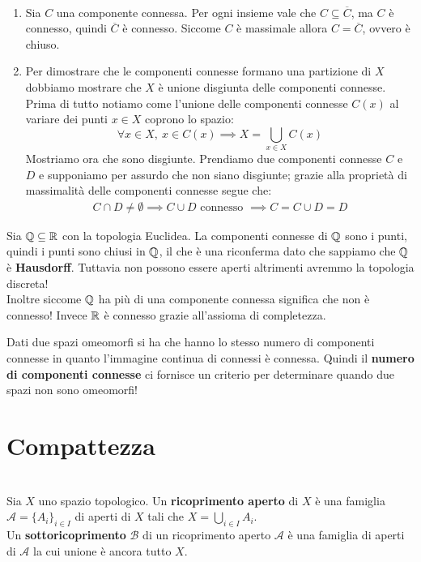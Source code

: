 \begin{demonstration}
	~{}
	\begin{enumerate}[label=\Roman*]
		\item Sia $C$ una componente connessa. Per ogni insieme vale che $C\subseteq\overline{C}$, ma $C$ è connesso, quindi $\overline{C}$ è connesso. Siccome $C$ è massimale allora $C=\overline{C}$, ovvero è chiuso.
		\item Per dimostrare che le componenti connesse formano una partizione di $X$ dobbiamo mostrare che $X$ è unione disgiunta delle componenti connesse. Prima di tutto notiamo come l'unione delle componenti connesse $C\left(x\right)$ al variare dei punti $x\in X$ coprono lo spazio:
			\begin{equation*}
				\forall x\in X,\ x\in C(x) \implies X=\bigcup_{x\in X}C(x)
			\end{equation*}
		Mostriamo ora che sono disgiunte. Prendiamo due componenti connesse $C$ e $D$ e supponiamo per assurdo che non siano disgiunte; grazie alla proprietà di massimalità delle componenti connesse segue che:
		\begin{gather*}
			C\cap D\neq\emptyset \implies C\cup D \text{ connesso } \implies C=C\cup D=D
		\end{gather*}
	\end{enumerate}
\vspace{-6mm}
\end{demonstration}
\begin{example}
	Sia $\mathbb{Q}\subseteq\mathbb{R}$ con la topologia Euclidea. La componenti connesse di $\mathbb{Q}$ sono i punti, quindi i punti sono chiusi in $\mathbb{Q}$, il che è una riconferma dato che sappiamo che $\mathbb{Q}$ è \textbf{Hausdorff}. Tuttavia non possono essere aperti altrimenti avremmo la topologia discreta!\\
	Inoltre siccome $\mathbb{Q}$ ha più di una componente connessa significa che non è connesso! Invece $\mathbb{R}$ è connesso grazie all'assioma di completezza.
\end{example}
\begin{observe}
	Dati due spazi omeomorfi si ha che hanno lo stesso numero di componenti connesse in quanto l'immagine continua di connessi è connessa. Quindi il \textbf{numero di componenti connesse} ci fornisce un criterio per determinare quando due spazi non sono omeomorfi!
\end{observe}


		\section{Compattezza}
\begin{define}~{}\\
	Sia $X$ uno spazio topologico. Un \textbf{ricoprimento aperto} di $X$ è una famiglia $\mathcal{A}=\{A_i \}_{i\in I}$ di aperti di $X$ tali che $\displaystyle X=\bigcup_{i\in I} A_i$. \\
	Un \textbf{sottoricoprimento} $\mathcal{B}$ di un ricoprimento aperto $\mathcal{A}$ è una famiglia di aperti di $\mathcal{A}$ la cui unione è ancora tutto $X$.
\end{define}		

